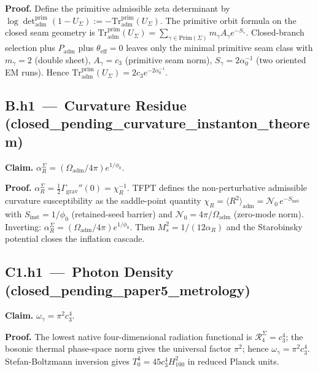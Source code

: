 \textbf{Proof.}
Define the primitive admissible zeta determinant by
\(\log\det_{\mathrm{adm}}^{\mathrm{prim}}(1-U_\Sigma):=
-\mathrm{Tr}_{\mathrm{adm}}^{\mathrm{prim}}(U_\Sigma)\).
The primitive orbit formula on the closed seam geometry is
\(\mathrm{Tr}_{\mathrm{adm}}^{\mathrm{prim}}(U_\Sigma)=
\sum_{\gamma\in\mathrm{Prim}(\Sigma)}m_\gamma A_\gamma e^{-S_\gamma}\).
Closed-branch selection plus \(P_{\mathrm{adm}}\) plus
\(\theta_{\mathrm{eff}}=0\) leaves only the minimal primitive seam
class with \(m_\gamma=2\) (double sheet), \(A_\gamma=c_3\) (primitive
seam norm), \(S_\gamma=2\alpha_0^{-1}\) (two oriented EM runs).
Hence \(\mathrm{Tr}_{\mathrm{adm}}^{\mathrm{prim}}(U_\Sigma)=
2c_3 e^{-2\alpha_0^{-1}}\).

\subsection*{B.h1 \,---\, Curvature Residue
\,(\textsf{closed\_pending\_curvature\_instanton\_theorem})}
\textbf{Claim.}
\(\alpha_R^\Sigma=(\Omega_{\mathrm{adm}}/4\pi)e^{1/\phi_0}\).

\textbf{Proof.}
\(\alpha_R^\Sigma=\tfrac12\Gamma_{\mathrm{grav}}''(0)=\chi_R^{-1}\).
TFPT defines the non-perturbative admissible curvature susceptibility
as the saddle-point quantity
\(\chi_R=\langle R^2\rangle_{\mathrm{adm}}=
\mathcal N_0\,e^{-S_{\mathrm{inst}}}\) with
\(S_{\mathrm{inst}}=1/\phi_0\) (retained-seed barrier) and
\(\mathcal N_0=4\pi/\Omega_{\mathrm{adm}}\) (zero-mode norm).
Inverting: \(\alpha_R^\Sigma=
(\Omega_{\mathrm{adm}}/4\pi)e^{1/\phi_0}\).
Then \(M_s^2=1/(12\alpha_R)\) and the Starobinsky potential closes the
inflation cascade.

\subsection*{C1.h1 \,---\, Photon Density
\,(\textsf{closed\_pending\_paper5\_metrology})}
\textbf{Claim.}
\(\omega_\gamma=\pi^2 c_3^4\).

\textbf{Proof.}
The lowest native four-dimensional radiation functional is
\(\mathcal R_4^\Sigma=c_3^4\); the bosonic thermal phase-space norm
gives the universal factor \(\pi^2\); hence
\(\omega_\gamma=\pi^2 c_3^4\).  Stefan-Boltzmann inversion gives
\(T_0^4=45 c_3^4 H_{100}^2\) in reduced Planck units.

